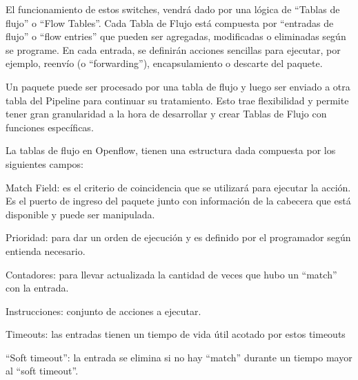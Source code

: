 \documentclass[12pt,a4paper,oneside]{book}
\begin{document}
El funcionamiento de estos switches, vendrá dado por una lógica de “Tablas de flujo” o “Flow Tables”. Cada Tabla de Flujo está compuesta por “entradas de flujo” o “flow entries” que pueden ser agregadas, modificadas o eliminadas según se programe. En cada entrada, se definirán acciones sencillas para ejecutar, por ejemplo, reenvío (o “forwarding”), encapsulamiento o descarte del paquete.

\vspace{0.5cm}

Un paquete puede ser procesado por una tabla de flujo y luego ser enviado a otra tabla del Pipeline para continuar su tratamiento. Esto trae flexibilidad y permite tener gran granularidad a la hora de desarrollar y crear Tablas de Flujo con funciones específicas.

\vspace{0.5cm}

La tablas de flujo en Openflow, tienen una estructura dada compuesta por los siguientes campos:

\vspace{0.5cm}

Match Field: es el criterio de coincidencia que se utilizará para ejecutar la acción. Es el puerto de ingreso del paquete junto con información de la cabecera que está disponible y puede ser manipulada.

\vspace{0.5cm}

Prioridad: para dar un orden de ejecución y es definido por el programador según entienda necesario.

\vspace{0.5cm}

Contadores: para llevar actualizada la cantidad de veces que hubo un “match” con la entrada.

\vspace{0.5cm}

Instrucciones: conjunto de acciones a ejecutar. 

\vspace{0.5cm}

Timeouts: las entradas tienen un tiempo de vida útil acotado por estos timeouts

\vspace{0.5cm}

“Soft timeout”: la entrada se elimina si no hay “match” durante un tiempo mayor al “soft timeout”.

\vspace{0.5cm}
\end{document}
